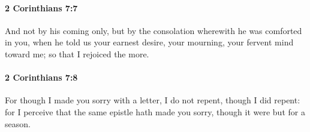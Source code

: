 		\paragraph{2 Corinthians 7:7} %
			\label{2CORINTHIANS-7-7}

			And not by his coming only, but by the consolation wherewith he was comforted in you, when he told us your earnest desire, your mourning, your fervent mind toward me; so that I rejoiced the more.

			\begin{framed}
			\scriptsize
				\begin{compactdesc}
					\item[SBLG] 
				\end{compactdesc}
			\end{framed}

		\paragraph{2 Corinthians 7:8} %
			\label{2CORINTHIANS-7-8}

			For though I made you sorry with a letter, I do not repent, though I did repent: for I perceive that the same epistle hath made you sorry, though it were but for a season.

